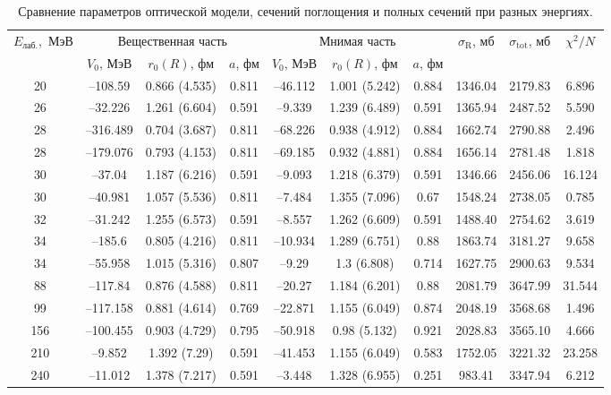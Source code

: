 \documentclass[a4paper, 12pt]{article}
\begin{document}
\begin{table}%
	\caption{Сравнение параметров оптической модели, сечений поглощения и полных сечений при разных энергиях.}
	\label{tab:params}
	\centering\scriptsize
	\begin{tabular}{c|ccc|ccc|ccc}
		\multirow{2}{*}{$E_\text{лаб.}$,~МэВ} & \multicolumn{3}{c|}{Вещественная часть} &
		\multicolumn{3}{c|}{Мнимая часть} & \multirow{2}{*}{$\sigma_\text{R}$, мб} &
		\multirow{2}{*}{$\sigma_\text{tot}$, мб} & \multirow{2}{*}{$\chi^2/N$} \\
		 & $V_0$, МэВ & $r_0(R)$, фм & $a$, фм & $V_0$, МэВ & $r_0(R)$, фм & $a$, фм \\
		 \hline
		20~\cite{20mev} & --108.59 & 0.866 (4.535) & 0.811 & --46.112 & 1.001 (5.242) & 0.884 & 1346.04 & 2179.83 & 6.896 \\
		26~\cite{26-28-30-34mev} & --32.226 & 1.261 (6.604) & 0.591 & --9.339 & 1.239 (6.489) & 0.591 & 1365.94 & 2487.52 & 5.590 \\
		28~\cite{28-34mev} & --316.489 & 0.704 (3.687) & 0.811 & --68.226 & 0.938 (4.912) & 0.884 & 1662.74 & 2790.88 & 2.496 \\
		\arrayrulecolor{lightgray}\hline\arrayrulecolor{black}
		28~\cite{26-28-30-34mev} & --179.076 & 0.793 (4.153) & 0.811 & --69.185 & 0.932 (4.881) & 0.884 & 1656.14 & 2781.48 & 1.818 \\
		30~\cite{30mev} & --37.04 & 1.187 (6.216) & 0.591 & --9.093 & 1.218 (6.379) & 0.591 & 1346.66 & 2456.06 & 16.124 \\
		30~\cite{26-28-30-34mev} & --40.981 & 1.057 (5.536) & 0.811 & --7.484 & 1.355 (7.096) & 0.67 & 1548.24 & 2738.05 & 0.785 \\
		\arrayrulecolor{lightgray}\hline\arrayrulecolor{black}
		32~\cite{32mev} & --31.242 & 1.255 (6.573) & 0.591 & --8.557 & 1.262 (6.609) & 0.591 & 1488.40 & 2754.62 & 3.619 \\
		34~\cite{28-34mev} & --185.6 & 0.805 (4.216) & 0.811 & --10.934 & 1.289 (6.751) & 0.88 & 1863.74 & 3181.27 & 9.658 \\
		34~\cite{26-28-30-34mev} & --55.958 & 1.015 (5.316) & 0.807 & --9.29 & 1.3 (6.808) & 0.714 & 1627.75 & 2900.63 & 9.534 \\
		\arrayrulecolor{lightgray}\hline\arrayrulecolor{black}
		88~\cite{88mev} & --117.84 & 0.876 (4.588) & 0.811 & --20.27 & 1.184 (6.201) & 0.88 & 2081.79 & 3647.99 & 31.544 \\
		99~\cite{99mev} & --117.158 & 0.881 (4.614) & 0.769 & --22.871 & 1.155 (6.049) & 0.874 & 2048.19 & 3568.68 & 1.496 \\
		156~\cite{156mev} & --100.455 & 0.903 (4.729) & 0.795 & --50.918 & 0.98 (5.132) & 0.921 & 2028.83 & 3565.10 & 4.666 \\
		\arrayrulecolor{lightgray}\hline\arrayrulecolor{black}
		210~\cite{210mev} & --9.852 & 1.392 (7.29) & 0.591 & --41.453 & 1.155 (6.049) & 0.583 & 1752.05 & 3221.32 & 23.258 \\
		240~\cite{240mev} & --11.012 & 1.378 (7.217) & 0.591 & --3.448 & 1.328 (6.955) & 0.251 & 983.41 & 3347.94 & 6.212 \\
	\end{tabular}
\end{table}%
\end{document}
